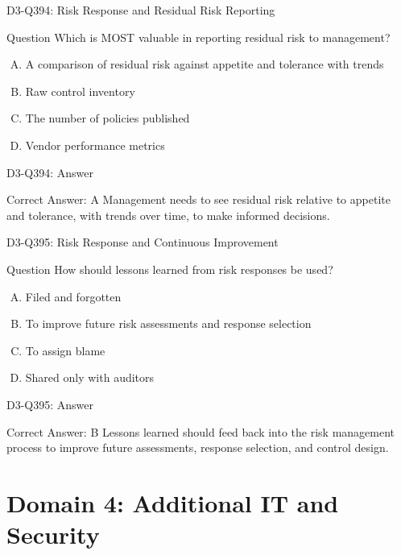 \documentclass{beamer}
\begin{document}
\begin{frame}{D3-Q394: Risk Response and Residual Risk Reporting}
	\begin{block}{Question}
		Which is MOST valuable in reporting residual risk to management?
	\end{block}
	\begin{enumerate}[(A)]
		\item A comparison of residual risk against appetite and tolerance with trends
		\item Raw control inventory
		\item The number of policies published
		\item Vendor performance metrics
	\end{enumerate}
\end{frame}
\begin{frame}{D3-Q394: Answer}
	\begin{block}{Correct Answer: A}
		Management needs to see residual risk relative to appetite and tolerance, with trends over time, to make informed decisions.
	\end{block}
\end{frame}

\begin{frame}{D3-Q395: Risk Response and Continuous Improvement}
	\begin{block}{Question}
		How should lessons learned from risk responses be used?
	\end{block}
	\begin{enumerate}[(A)]
		\item Filed and forgotten
		\item To improve future risk assessments and response selection
		\item To assign blame
		\item Shared only with auditors
	\end{enumerate}
\end{frame}
\begin{frame}{D3-Q395: Answer}
	\begin{block}{Correct Answer: B}
		Lessons learned should feed back into the risk management process to improve future assessments, response selection, and control design.
	\end{block}
\end{frame}


\section{Domain 4: Additional IT and Security}
\end{document}
